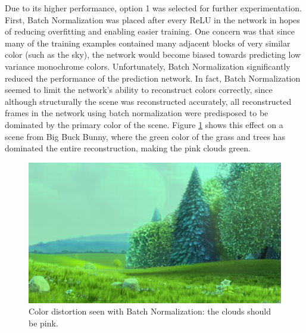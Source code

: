 \documentclass[10pt,twocolumn,letterpaper]{article}
\begin{document}
Due to its higher performance, option 1 was selected for further experimentation. First, Batch Normalization was placed after every ReLU in the network in hopes of reducing overfitting and enabling easier training. One concern was that since many of the training examples contained many adjacent blocks of very similar color (such as the sky), the network would become biased towards predicting low variance monochrome colors. Unfortunately, Batch Normalization significantly reduced the performance of the prediction network. In fact, Batch Normalization seemed to limit the network's ability to reconstruct colors correctly, since although structurally the scene was reconstructed accurately, all reconstructed frames in the network using batch normalization were predisposed to be dominated by the primary color of the scene. Figure \ref{fig:monochrome} shows this effect on a scene from Big Buck Bunny, where the green color of the grass and trees has dominated the entire reconstruction, making the pink clouds green.

\begin{figure}[t]
\begin{center}
  \includegraphics[width=0.8\linewidth]{green}
\end{center}
   \caption{Color distortion seen with Batch Normalization: the clouds should be pink.}
   \label{fig:monochrome}
\end{figure}
\end{document}
